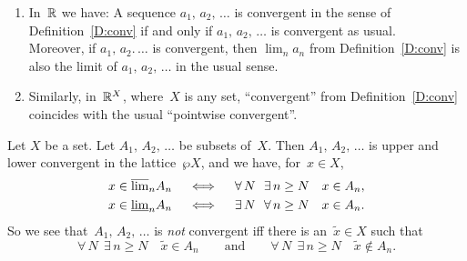 \documentclass[main.tex]{subfiles}
\begin{document}
%
\begin{exs}
\label{E:conv}
\begin{enumerate}
\item 
In~$\mathbb{R}$ we have:
A sequence $a_1,\,a_2,\,\dotsc$
is convergent in the sense of Definition~\ref{D:conv}
if and only if $a_1,\,a_2,\,\dotsc$
is convergent as usual.\\
Moreover, if $a_1,\,a_2.\,\dotsc$
is convergent, then $\lim_n a_n$ from Definition~\ref{D:conv}
is also the limit of $a_1,\,a_2,\,\dotsc$
in the usual sense.

\item
Similarly,
in~$\mathbb{R}^X$, where~$X$ is any set,
``convergent'' from Definition~\ref{D:conv}
coincides with the usual ``pointwise convergent''.
\end{enumerate}
\end{exs}

\begin{ex}
Let $X$ be a set.
Let $A_1,\,A_2,\,\dotsc$ be subsets of~$X$.
Then $A_1,\,A_2,\,\dotsc$
is upper and lower convergent in the lattice~$\wp X$, 
and we have, for~$x\in X$,
\begin{alignat*}{3}
x \in \smash{\overline{\lim}_{n}} A_n 
\quad&\iff\quad  \forall\,N\ \ \exists\, n\geq N \quad x\in A_n, \\
x \in \smash{\underline{\lim}_{n}} A_n 
\quad&\iff\quad  \exists\,N\ \ \forall\, n\geq N \quad x\in A_n.
\end{alignat*}
So we see that~$A_1,\,A_2,\,\dotsc$ is \emph{not} convergent
iff there is an~$\tilde{x}\in X$ such that
\begin{equation*}
\forall\,N\ \ \exists\, n\geq N \quad \tilde{x}\in A_n
\qquad\text{and}\qquad
\forall\,N\ \ \exists\, n\geq N \quad \tilde{x}\notin A_n.
\end{equation*}
\end{ex}
\end{document}
